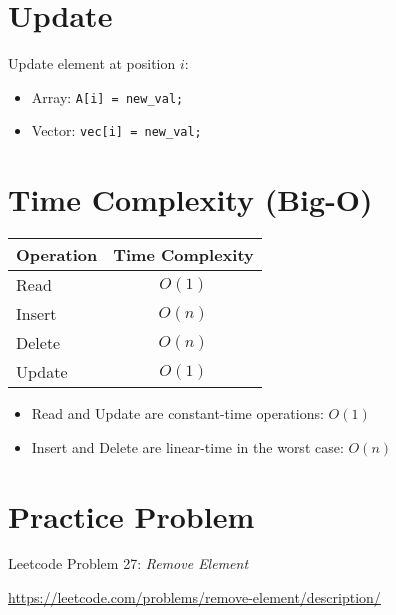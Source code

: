 \documentclass{article}
\begin{document}
\section{Update}
Update element at position $i$:

\begin{itemize}
    \item Array: \verb|A[i] = new_val;|
    \item Vector: \verb|vec[i] = new_val;|
\end{itemize}

\section{Time Complexity (Big-O)}

\begin{tabular}{|l|c|}
\hline
\textbf{Operation} & \textbf{Time Complexity} \\
\hline
Read   & $O(1)$ \\
Insert & $O(n)$ \\
Delete & $O(n)$ \\
Update & $O(1)$ \\
\hline
\end{tabular}

\begin{itemize}
    \item Read and Update are constant-time operations: $O(1)$
    \item Insert and Delete are linear-time in the worst case: $O(n)$
\end{itemize}

\section{Practice Problem}
Leetcode Problem 27: \textit{Remove Element}

\url{https://leetcode.com/problems/remove-element/description/}
\end{document}

